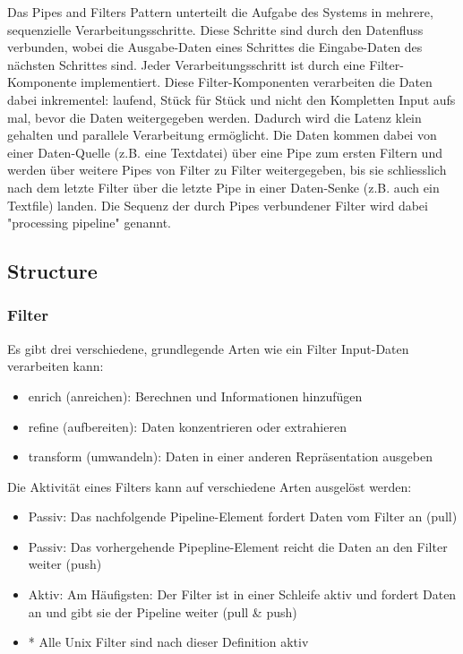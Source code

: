 Das Pipes and Filters Pattern unterteilt die Aufgabe des Systems in mehrere, sequenzielle Verarbeitungsschritte. Diese Schritte sind durch den Datenfluss verbunden, wobei die Ausgabe-Daten eines Schrittes die Eingabe-Daten des nächsten Schrittes sind. Jeder Verarbeitungsschritt ist durch eine Filter-Komponente implementiert. Diese Filter-Komponenten verarbeiten die Daten dabei inkrementel: laufend, Stück für Stück und nicht den Kompletten Input aufs mal, bevor die Daten weitergegeben werden. Dadurch wird die Latenz klein gehalten und parallele Verarbeitung ermöglicht. Die Daten kommen dabei von einer Daten-Quelle (z.B. eine Textdatei) über eine Pipe zum ersten Filtern und werden über weitere Pipes von Filter zu Filter weitergegeben, bis sie schliesslich nach dem letzte Filter über die letzte Pipe in einer Daten-Senke (z.B. auch ein Textfile) landen. Die Sequenz der durch Pipes verbundener Filter wird dabei "processing pipeline" genannt.

\subsection*{Structure}


\subsubsection*{Filter}


Es gibt drei verschiedene, grundlegende Arten wie ein Filter Input-Daten verarbeiten kann:

\begin{itemize}
	\item enrich (anreichen): Berechnen und Informationen hinzufügen
	\item refine (aufbereiten): Daten konzentrieren oder extrahieren
	\item transform (umwandeln): Daten in einer anderen Repräsentation ausgeben
\end{itemize}

Die Aktivität eines Filters kann auf verschiedene Arten ausgelöst werden:

\begin{itemize}
	\item Passiv: Das nachfolgende Pipeline-Element fordert Daten vom Filter an (pull)
	\item Passiv: Das vorhergehende Pipepline-Element reicht die Daten an den Filter weiter (push)
	\item Aktiv: Am Häufigsten: Der Filter ist in einer Schleife aktiv und fordert Daten an und gibt sie der Pipeline weiter (pull \& push)
	\item * Alle Unix Filter sind nach dieser Definition aktiv
\end{itemize}


